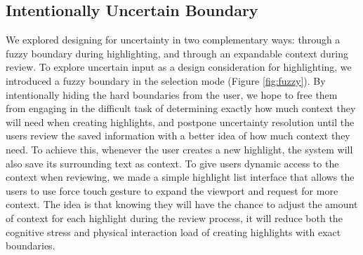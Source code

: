 \subsection{Intentionally Uncertain Boundary}


We explored designing for uncertainty in two complementary ways: through a fuzzy boundary during highlighting, and through an expandable context during review. To explore uncertain input as a design consideration for highlighting, we introduced a fuzzy boundary in the selection mode (Figure \ref{fig:fuzzy}). By intentionally hiding the hard boundaries from the user, we hope to free them from engaging in the difficult task of determining exactly how much context they will need when creating highlights, and postpone uncertainty resolution until the users review the saved information with a better idea of how much context they need. To achieve this, whenever the user creates a new highlight, the system will also save its surrounding text as context. To give users dynamic access to the context when reviewing, we made a simple highlight list interface that allows the users to use force touch gesture to expand the viewport and request for more context. The idea is that knowing they will have the chance to adjust the amount of context for each highlight during the review process, it will reduce both the cognitive stress and physical interaction load of creating highlights with exact boundaries.

